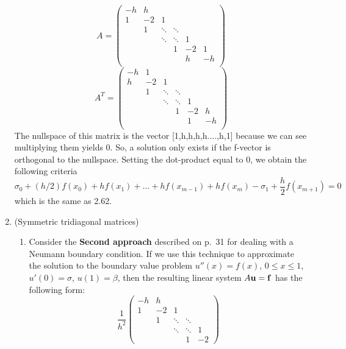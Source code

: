 \documentclass[letterpaper,12pt]{article}
\begin{document}
\begin{enumerate}
\[
A= \left( \begin{array}{cccccc}
-h & h &        &        &    &  \\
1  & -2 & 1      &        &    &  \\
   & 1  & \ddots & \ddots &     & \\
   &    & \ddots & \ddots & 1    & \\
   &    &        & 1      & -2 & 1 \\
      &    &        &       & h & -h \\
   \end{array} \right)
\]
\[
A^T= \left( \begin{array}{cccccc}
-h & 1 &        &        &    &  \\
h  & -2 & 1      &        &    &  \\
   & 1  & \ddots & \ddots &     & \\
   &    & \ddots & \ddots & 1    & \\
   &    &        & 1      & -2 & h \\
      &    &        &       & 1 & -h \\
   \end{array} \right)
\]
The nullspace of this matrix is the vector [1,h,h,h,h....,h,1] because we can see multiplying them yields 0.
So, a solution only exists if the f-vector is orthogonal to the nullspace. Setting the dot-product equal to 0, we obtain the following criteria
\[ \sigma_0 + (h/2) f( x_0 )  +  h f( x_1 ) +\hdots + 
h f( x_{m-1} ) +  h f( x_m ) - \sigma_1  +  \frac{h}{2} f( x_{m+1} ) = 0 \]
which is the same as 2.62.
\item (Symmetric tridiagonal matrices)
\begin{enumerate}
\item
Consider the {\bf Second approach} described on p.~31 for dealing with
a Neumann boundary condition.  If we use this technique to approximate
the solution to the boundary value problem $u'' (x) = f(x)$, 
$0 \leq x \leq 1$, $u' (0) = \sigma$, $u(1) = \beta$, then the resulting
linear system $A {\bf u} = {\bf f}$ has the following form:
\[
\frac{1}{h^2} \left( \begin{array}{ccccc}
-h & h  &        &        &      \\
1  & -2 & 1      &        &      \\
   & 1  & \ddots & \ddots &      \\
   &    & \ddots & \ddots & 1    \\
   &    &        & 1      & -2 \end{array} \right)
\]
\end{enumerate}
\end{enumerate}
\end{document}

